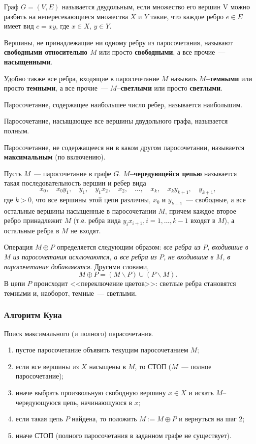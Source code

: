 Граф $G = (V,E)$ называется двудольным, если множество его вершин V можно разбить на непересекающиеся множества $X$ и $Y$ такие, что каждое ребро $e \in  E$ имеет вид $e = xy$, где $x \in  X$, $y \in Y$.

Вершины, не принадлежащие ни одному ребру из паросочетания, называют \textbf{свободными относительно $M$} или просто \textbf{свободными}, а все прочие~--- \textbf{насыщенными}.

Удобно также все ребра, входящие в паросочетание $M$ называть \textbf{$M$--темными} или просто \textbf{темными}, а все прочие~--- \textbf{$M$--светлыми} или просто \textbf{светлыми}.

Паросочетание, содержащее наибольшее число ребер, называется наибольшим.

Паросочетание, насыщающее все вершины двудольного графа, называется полным.

Паросочетание, не содержащееся ни в каком другом паросочетании, называется \textbf{максимальным} (по включению).

Пусть $M$~--- паросочетание в графе $G$. \textbf{$M$--чередующейся цепью} называется такая последовательность вершин и ребер вида 
$$
 x_0,\quad x_0y_1,\quad y_1,\quad y_1x_2,\quad x_2,\quad \ldots,\quad x_k,\quad x_ky_{k+1},\quad y_{k+1}, 
 $$
 где $k > 0$, что все вершины этой цепи различны, $x_0$ и $y_{k+1}$~--- свободные, а все остальные вершины насыщенные в паросочетании $M$, причем каждое второе ребро принадлежит $M$ (т.е. ребра вида $y_ix_{i+1}, i=1,\ldots,k-1$ входят в $M$), а остальные ребра в $M$ не входят.

Операция $M\oplus P$ определяется следующим образом: \textit{все ребра из $P$, входившие в $M$ из паросочетания исключаются, а все ребра из $P$, не входившие в $M$, в паросочетание добавляются}. Другими словами,
$$
  M\oplus P=(M\backslash P)\cup(P\backslash M).
$$
В цепи $P$ происходит <<переключение цветов>>: светлые ребра становятся темными и, наоборот, темные~--- светлыми.

\subsubsection{Алгоритм Куна}
Поиск максимального (и полного) парасочетания.
\begin{enumerate}
\item пустое паросочетание объявить текущим паросочетанием $M$;
\item если все вершины из $X$ насыщены в $M$, то СТОП ($M$~--- полное паросочетание);
\item иначе выбрать произвольную свободную вершину $x\in X$ и искать $M$--чередующуюся цепь, начинающуюся в $x$;

\item если такая цепь $P$ найдена, то положить $M:=M\oplus P$ и вернуться на шаг 2;

\item иначе СТОП (полного паросочетания в заданном графе не существует).
\end{enumerate}

